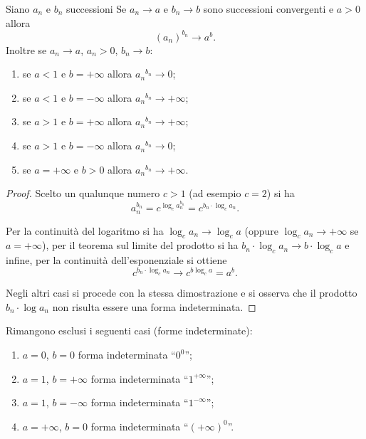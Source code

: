 \begin{theorem}
Siano $a_n$ e $b_n$ successioni
Se $a_n\to a$ e $b_n \to b$
sono successioni convergenti e $a>0$
allora
\[
  (a_n)^{b_n} \to a^b.
\]
Inoltre se $a_n \to a$, $a_n>0$, $b_n \to b$:
\begin{enumerate}
\item se $a<1$ e $b=+\infty$ allora ${a_n}^{b_n} \to 0$;
\item se $a<1$ e $b=-\infty$ allora ${a_n}^{b_n} \to +\infty$;
\item se $a>1$ e $b=+\infty$ allora ${a_n}^{b_n} \to +\infty$;
\item se $a>1$ e $b=-\infty$ allora ${a_n}^{b_n} \to 0$;
\item se $a=+\infty$ e $b>0$ allora ${a_n}^{b_n} \to +\infty$.
\end{enumerate}

\end{theorem}
%
\begin{proof}
Scelto un qualunque numero $c>1$ (ad esempio $c=2$)
si ha
\[
  a_n^{b_n} = c^{\log_c a_n^{b_n}}
   = c^{b_n \cdot \log_c a_n}.
\]

Per la continuità del logaritmo si ha $\log_c a_n \to \log_c a$
(oppure $\log_c a_n \to +\infty$ se $a=+\infty$),
per il teorema sul limite del prodotto si ha $b_n\cdot \log_c a_n \to b\cdot \log_c a$
e infine, per la continuità dell'esponenziale si ottiene
\[
  c^{b_n \cdot \log_c a_n} \to c^{b\log_c a} = a^b.
\]

Negli altri casi si procede con la stessa dimostrazione
e si osserva che il prodotto $b_n \cdot \log a_n$ non risulta essere
una forma indeterminata.
\end{proof}

Rimangono esclusi i seguenti casi (forme indeterminate):
\begin{enumerate}
\item $a=0$, $b=0$ forma indeterminata ``$0^0$'';
\item $a=1$, $b=+\infty$ forma indeterminata ``$1^{+\infty}$'';
\item $a=1$, $b=-\infty$ forma indeterminata ``$1^{-\infty}$'';
\item $a=+\infty$, $b=0$ forma indeterminata ``$(+\infty)^0$''.
\end{enumerate}










